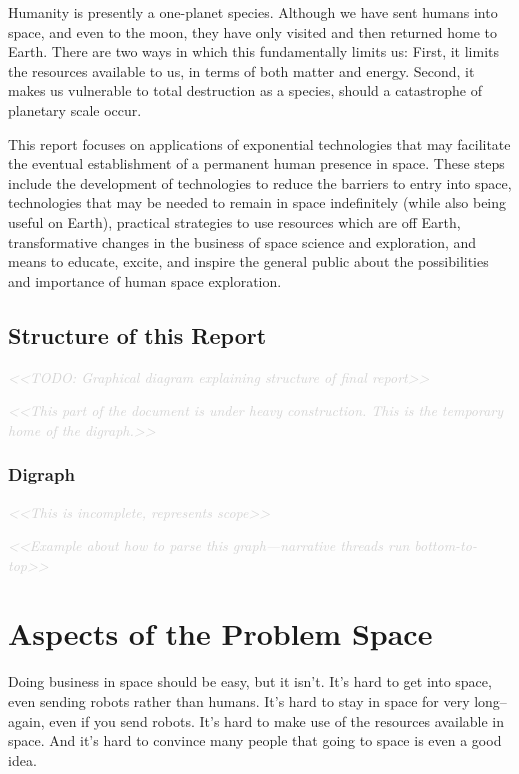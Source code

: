 \documentclass[letter,11pt]{article}
\newcommand{\todo}[1]{\textcolor{lightgray}{\textit{<<#1>>}}}
\begin{document}
Humanity is presently a one-planet species. Although we have sent
humans into space, and even to the moon, they have only visited and
then returned home to Earth. There are two ways in which this
fundamentally limits us: First, it limits the resources available to
us, in terms of both matter and energy. Second, it makes us vulnerable
to total destruction as a species, should a catastrophe of planetary
scale occur.

This report focuses on applications of exponential technologies that may
facilitate the eventual establishment of a permanent human presence in space.
These steps include the development of technologies to reduce the barriers to
entry into space, technologies that may be needed to remain in space
indefinitely (while also being useful on Earth), practical strategies to use
resources which are off Earth, transformative changes in the business of space
science and exploration, and means to educate, excite, and inspire the general
public about the possibilities and importance of human space exploration.

\subsection{Structure of this Report}

\todo{TODO: Graphical diagram explaining structure of final report}

\todo{This part of the document is under heavy construction. This is the temporary home of the digraph.}

\subsubsection{Digraph}

\todo{This is incomplete, represents scope}

\todo{Example about how to parse this graph---narrative threads run bottom-to-top}





\section{Aspects of the Problem Space}
\label{problem-spaces}
Doing business in space should be easy, but it isn't. It's hard to get into
space, even sending robots rather than humans. It's hard to stay in space for
very long--again, even if you send robots.  It's hard to make use of the
resources available in space. And it's hard to convince many people that going
to space is even a good idea.
\end{document}
